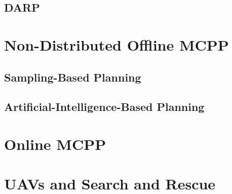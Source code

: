 \subsection{DARP}

\section{Non-Distributed Offline MCPP}
\subsection{Sampling-Based Planning}
\subsection{Artificial-Intelligence-Based Planning}

\section{Online MCPP}


\section{UAVs and Search and Rescue}


